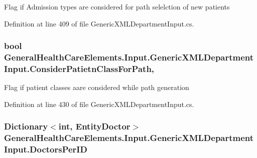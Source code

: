 Flag if Admission types are considered for path selelction of new patients 



Definition at line 409 of file Generic\+X\+M\+L\+Department\+Input.\+cs.

\subsubsection[{\texorpdfstring{Consider\+Patietn\+Class\+For\+Path}{ConsiderPatietnClassForPath}}]{\setlength{\rightskip}{0pt plus 5cm}bool General\+Health\+Care\+Elements.\+Input.\+Generic\+X\+M\+L\+Department\+Input.\+Consider\+Patietn\+Class\+For\+Path\hspace{0.3cm}{\ttfamily [get]}, {\ttfamily [set]}}\hypertarget{class_general_health_care_elements_1_1_input_1_1_generic_x_m_l_department_input_a67adcd2bf9ebebd38fe3f1eb1bce9c50}{}\label{class_general_health_care_elements_1_1_input_1_1_generic_x_m_l_department_input_a67adcd2bf9ebebd38fe3f1eb1bce9c50}


Flag if patient classes aare considered while path generation 



Definition at line 430 of file Generic\+X\+M\+L\+Department\+Input.\+cs.

\subsubsection[{\texorpdfstring{Doctors\+Per\+ID}{DoctorsPerID}}]{\setlength{\rightskip}{0pt plus 5cm}Dictionary$<$int, {\bf Entity\+Doctor}$>$ General\+Health\+Care\+Elements.\+Input.\+Generic\+X\+M\+L\+Department\+Input.\+Doctors\+Per\+ID\hspace{0.3cm}{\ttfamily [get]}}\hypertarget{class_general_health_care_elements_1_1_input_1_1_generic_x_m_l_department_input_a78bc2348758677c21ac342ccb2f5028c}{}\label{class_general_health_care_elements_1_1_input_1_1_generic_x_m_l_department_input_a78bc2348758677c21ac342ccb2f5028c}


